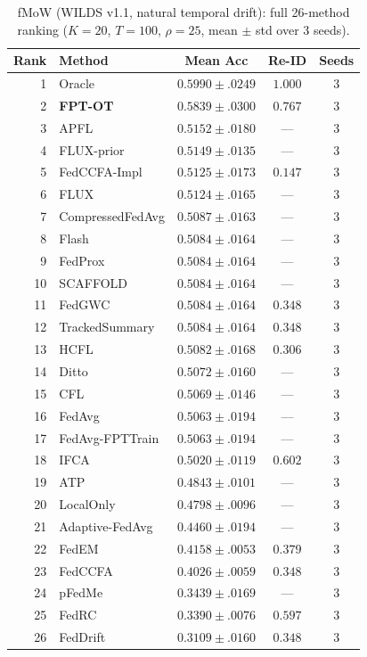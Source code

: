 \begin{table}[h]
\centering
\caption{fMoW (WILDS v1.1, natural temporal drift): full 26-method ranking ($K{=}20$, $T{=}100$, $\rho{=}25$, mean $\pm$ std over 3 seeds).}
\label{tab:cross_fmow_full}
\scriptsize
\setlength{\tabcolsep}{3pt}
\begin{tabular}{rlccc}
\toprule
Rank & Method & Mean Acc & Re-ID & Seeds \\
\midrule
1  & Oracle              & $0.5990 \pm .0249$ & $1.000$ & 3 \\
2  & \textbf{FPT-OT}     & $\mathbf{0.5839 \pm .0300}$ & $0.767$ & 3 \\
\midrule
3  & APFL                & $0.5152 \pm .0180$ & — & 3 \\
4  & FLUX-prior          & $0.5149 \pm .0135$ & — & 3 \\
5  & FedCCFA-Impl        & $0.5125 \pm .0173$ & $0.147$ & 3 \\
6  & FLUX                & $0.5124 \pm .0165$ & — & 3 \\
7  & CompressedFedAvg    & $0.5087 \pm .0163$ & — & 3 \\
8  & Flash               & $0.5084 \pm .0164$ & — & 3 \\
9  & FedProx             & $0.5084 \pm .0164$ & — & 3 \\
10 & SCAFFOLD            & $0.5084 \pm .0164$ & — & 3 \\
11 & FedGWC              & $0.5084 \pm .0164$ & $0.348$ & 3 \\
12 & TrackedSummary      & $0.5084 \pm .0164$ & $0.348$ & 3 \\
13 & HCFL                & $0.5082 \pm .0168$ & $0.306$ & 3 \\
14 & Ditto               & $0.5072 \pm .0160$ & — & 3 \\
15 & CFL                 & $0.5069 \pm .0146$ & — & 3 \\
16 & FedAvg              & $0.5063 \pm .0194$ & — & 3 \\
17 & FedAvg-FPTTrain     & $0.5063 \pm .0194$ & — & 3 \\
18 & IFCA                & $0.5020 \pm .0119$ & $0.602$ & 3 \\
19 & ATP                 & $0.4843 \pm .0101$ & — & 3 \\
20 & LocalOnly           & $0.4798 \pm .0096$ & — & 3 \\
21 & Adaptive-FedAvg     & $0.4460 \pm .0194$ & — & 3 \\
22 & FedEM               & $0.4158 \pm .0053$ & $0.379$ & 3 \\
23 & FedCCFA             & $0.4026 \pm .0059$ & $0.348$ & 3 \\
24 & pFedMe              & $0.3439 \pm .0169$ & — & 3 \\
25 & FedRC               & $0.3390 \pm .0076$ & $0.597$ & 3 \\
26 & FedDrift            & $0.3109 \pm .0160$ & $0.348$ & 3 \\
\bottomrule
\end{tabular}
\end{table}
